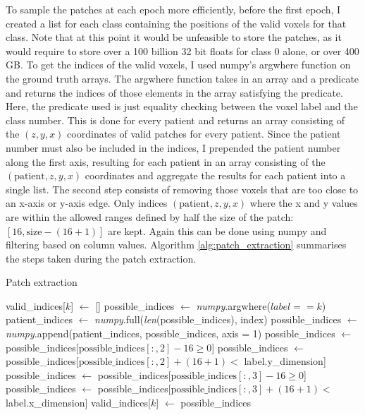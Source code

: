 \documentclass[12pt,a4paper,twoside,openright]{report}
\begin{document}
To sample the patches at each epoch more efficiently, before the first epoch, I created a list for each class containing the positions of the valid voxels for that class. Note that at this point it would be unfeasible to store the patches, as it would require to store over a 100 billion 32 bit floats for class 0 alone, or over 400 GB. To get the indices of the valid voxels, I used numpy's argwhere function on the ground truth arrays. The argwhere function takes in an array and a predicate and returns the indices of those elements in the array satisfying the predicate. Here, the predicate used is just equality checking between the voxel label and the class number. This is done for every patient and returns an array consisting of the $(z, y, x)$ coordinates of valid patches for every patient. Since the patient number must also be included in the indices, I prepended the patient number along the first axis, resulting for each patient in an array consisting of the $(\text{patient}, z, y, x)$ coordinates and aggregate the results for each patient into a single list. The second step consists of removing those voxels that are too close to an x-axis or y-axis edge. Only indices $(\text{patient}, z, y, x)$ where the x and y values are  within the allowed ranges defined by half the size of the patch: $[16, \text{size}-(16+1)]$ are kept. Again this can be done using numpy and filtering based on column values. Algorithm \ref{alg:patch_extraction} summarises the steps taken during the patch extraction.

\begin{algorithm}[h]
\caption{Patch extraction}\label{alg:patch_extraction}
\begin{algorithmic}[1]
	\State valid\_indices[$k$] $\gets$ []
		\State possible\_indices $\gets$ \textit{numpy}.argwhere($label == k$)
		\State patient\_indices $\gets$ \textit{numpy}.full(\textit{len}(possible\_indices), index)
		\State possible\_indices $\gets$ \textit{numpy}.append(patient\_indices, possible\_indices, axis = 1)
		\State
		\State possible\_indices $\gets$ possible\_indices[$\text{possible\_indices}[:,2] - 16 \ge 0$]
		\State possible\_indices $\gets$ possible\_indices[$\text{possible\_indices}[:,2] + (16+1) < $ label.y\_dimension]
		\State possible\_indices $\gets$ possible\_indices[$\text{possible\_indices}[:,3] - 16 \ge 0$]
		\State possible\_indices $\gets$ possible\_indices[$\text{possible\_indices}[:,3] + (16+1) < $ label.x\_dimension]
		\State
		\State valid\_indices[$k$] $\gets$ possible\_indices
	\EndFor
\EndFor
\end{algorithmic}
\end{algorithm}
\end{document}

